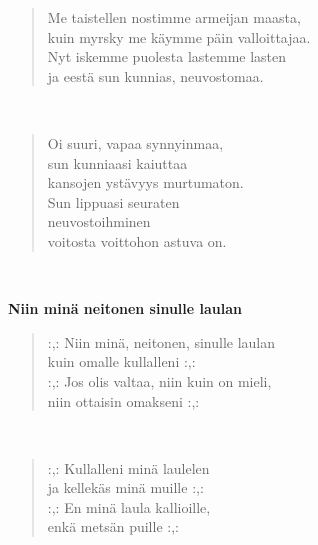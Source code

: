 \noindent\begin{minipage}{\linewidth}
\begin{verse}
	Me taistellen nostimme armeijan maasta,\\
	kuin myrsky me käymme päin valloittajaa.\\
	Nyt iskemme puolesta lastemme lasten\\
	ja eestä sun kunnias, neuvostomaa.\\
\end{verse}
\end{minipage}\\[10pt]
\noindent\begin{minipage}{\linewidth}
\begin{verse}
	Oi suuri, vapaa synnyinmaa,\\
	sun kunniaasi kaiuttaa\\
	kansojen ystävyys murtumaton.\\
	Sun lippuasi seuraten\\
	neuvostoihminen\\
	voitosta voittohon astuva on.\\
\end{verse}
\end{minipage}\\[10pt]
%
%
\noindent\begin{minipage}{\linewidth}
\vspace{5pt}
\parbox[t]{0.85\linewidth}{\raggedright {\large\bf Niin minä neitonen sinulle laulan}\\[6pt]}
\begin{verse}
	\hspace{0pt-\widthof{:,: }}:,: Niin minä, neitonen, sinulle laulan\\
	kuin omalle kullalleni :,:\\
	\hspace{0pt-\widthof{:,: }}:,: Jos olis valtaa, niin kuin on mieli,\\
	niin ottaisin omakseni :,:\\
\end{verse}
\end{minipage}\\[10pt]
\noindent\begin{minipage}{\linewidth}
\begin{verse}
	\hspace{0pt-\widthof{:,: }}:,: Kullalleni minä laulelen\\
	ja kellekäs minä muille :,:\\
	\hspace{0pt-\widthof{:,: }}:,: En minä laula kallioille,\\
	enkä metsän puille :,:\\
\end{verse}
\end{minipage}\\[10pt]
